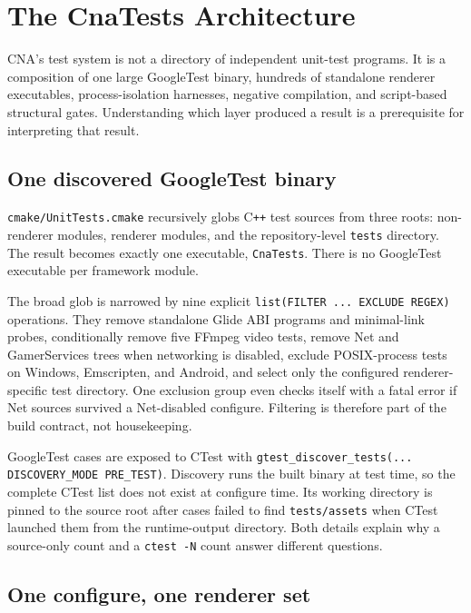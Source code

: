 \chapter{The CnaTests Architecture}
\label{ch:cnatests-architecture}
\label{ch:verification-methodology}

CNA's test system is not a directory of independent unit-test programs.  It is a composition
of one large GoogleTest binary, hundreds of standalone renderer executables, process-isolation
harnesses, negative compilation, and script-based structural gates.  Understanding which layer
produced a result is a prerequisite for interpreting that result.

\section{One discovered GoogleTest binary}

\texttt{cmake/UnitTests.cmake} recursively globs C\texttt{++} test sources from three roots:
non-renderer modules, renderer modules, and the repository-level \texttt{tests} directory.  The
result becomes exactly one executable, \texttt{CnaTests}.  There is no GoogleTest executable per
framework module.

The broad glob is narrowed by nine explicit \texttt{list(FILTER ... EXCLUDE REGEX)} operations.
They remove standalone Glide ABI programs and minimal-link probes, conditionally remove five
FFmpeg video tests, remove Net and GamerServices trees when networking is disabled, exclude
POSIX-process tests on Windows, Emscripten, and Android, and select only the configured
renderer-specific test directory.  One exclusion group even checks itself with a fatal error
if Net sources survived a Net-disabled configure.  Filtering is therefore part of the build
contract, not housekeeping.

GoogleTest cases are exposed to CTest with
\texttt{gtest\_discover\_tests(... DISCOVERY\_MODE PRE\_TEST)}.  Discovery runs the built binary
at test time, so the complete CTest list does not exist at configure time.  Its working directory
is pinned to the source root after cases failed to find \texttt{tests/assets} when CTest launched
them from the runtime-output directory.  Both details explain why a source-only count and a
\texttt{ctest -N} count answer different questions.

\section{One configure, one renderer set}

